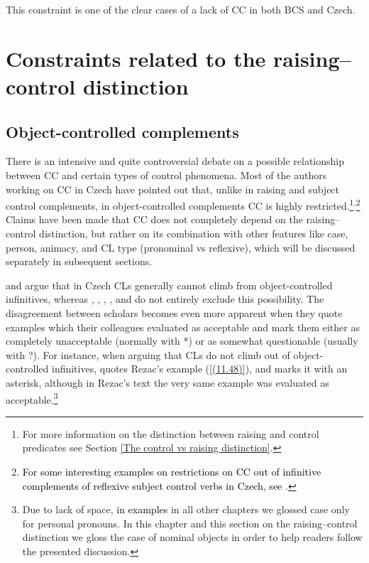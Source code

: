 \noindent This constraint is one of the clear cases of a lack of CC in both BCS and Czech.

\section{Constraints related to the raising--control distinction}
\label{Constraints related to the raising-control distinction}
\subsection{Object-controlled complements}
\label{Object-controlled complements}
There is an intensive and quite controversial debate on a possible relationship between CC and certain types of control phenomena. Most of the authors working on CC in Czech have pointed out that, unlike in raising and subject control complements, in object-controlled complements CC is highly restricted.\footnote{For more information on the distinction between raising and control predicates see Section \ref{The control vs raising distinction}.}\textsuperscript{,}\footnote{\textcolor{black}{For some interesting examples on restrictions on CC out of infinitive complements of reflexive subject control verbs in Czech, see \citet[159f]{Lenertova04}}.} Claims have been made that CC does not completely depend on the raising--control distinction, but rather on its combination with other features like case, person, animacy, and CL type (pronominal vs reflexive), which will be discussed separately in subsequent sections.

\citet{Thorpe91} and \citet{Junghanns02} argue that in Czech CLs generally cannot climb from object-controlled infinitives, whereas \citet{Rezac99, Rezac05}, \citet{Dotlacil04}, \citet{Lenertova04}, \citet{Hana07}, and \citet{LelandToman76} do not entirely exclude this possibility. The disagreement between scholars becomes even more apparent when they quote examples which their colleagues evaluated as acceptable and mark them either as completely unacceptable (normally with *) or as somewhat questionable (usually with ?). For instance, when arguing that CLs do not climb out of object-controlled infinitives, \citet[69]{Junghanns02} quotes Rezac’s example (\ref{(11.48)}), and marks it with an asterisk, although in Rezac’s text the very same example was evaluated as acceptable.\footnote{Due to lack of space, \textcolor{black}{in examples} in all other chapters we glossed case only for personal pronouns. In this chapter and this section on the raising--control distinction we gloss the case of nominal objects in order to help readers follow the presented discussion.} 

